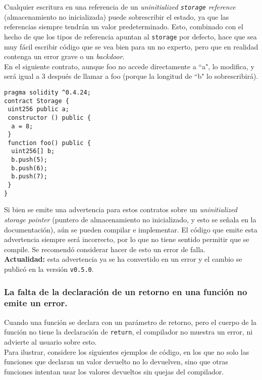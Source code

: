 Cualquier escritura en una referencia de un \textit{uninitialized \texttt{storage} reference} (almacenamiento no inicializada) puede sobrescribir el estado, ya que las referencias siempre tendrán un valor predeterminado. Esto, combinado con el hecho de que los tipos de referencia apuntan al \texttt{storage} por defecto, hace que sea muy fácil escribir código que se vea bien para un no experto, pero que en realidad contenga un error grave o un \textit{backdoor}.\\

En el siguiente contrato, aunque foo no accede directamente a ``a", lo modifica, y será igual a 3 después de llamar a foo (porque la longitud de ``b" lo sobrescribirá).\\

\begin{lstlisting}[language=Solidity, caption={Código de ejemplo en referencias no inicializadas}]
pragma solidity ^0.4.24;
contract Storage {
 uint256 public a;
 constructor () public {
  a = 8;
 }
 function foo() public {
  uint256[] b;
  b.push(5);
  b.push(6);
  b.push(7);
 }
}
\end{lstlisting}

Si bien se emite una advertencia para estos contratos sobre un \textit{uninitialized storage pointer} (puntero de almacenamiento no inicializado, y esto se señala en la documentación\cite{ReadTHeDocsSolidityMemoryKeyword}), aún se pueden compilar e implementar. El código que emite esta advertencia siempre será incorrecto, por lo que no tiene sentido permitir que se compile. Se recomendó considerar hacer de esto un error de falla.\\

\textbf{Actualidad:} esta advertencia ya se ha convertido en un error y el cambio se publicó\cite{GHPR3521} en la versión \texttt{v0.5.0}.\\

\subsubsection{La falta de la declaración de un retorno en una función no emite un error.}

Cuando una función se declara con un parámetro de retorno, pero el cuerpo de la función no tiene la declaración de \texttt{return}, el compilador no muestra un error, ni advierte al usuario sobre esto.\\

Para ilustrar, considere los siguientes ejemplos de código, en los que no solo las funciones que declaran un valor devuelto no lo devuelven, sino que otras funciones intentan usar los valores devueltos sin quejas del compilador.\\

